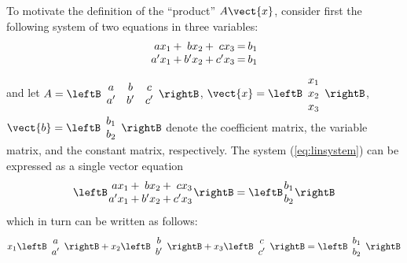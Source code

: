 To motivate the definition of the ``product'' $A\vect{x}$, consider first the following system of two equations in three variables:
\begin{equation}\label{eq:linsystem}
\arraycolsep=1pt
\begin{array}{rrrrrrr}
ax_{1} & + & bx_{2} & + & cx_{3} & = & b_{1} \\
a^{\prime}x_{1} & + & b^{\prime}x_{2} & + & c^{\prime}x_{3} & = & b_{1}
\end{array}
\end{equation}
and let $A = \leftB \begin{array}{ccc}
a & b & c \\
a^\prime & b^\prime & c^\prime
\end{array} \rightB$, 
$\vect{x} = \leftB \begin{array}{c}
x_{1} \\
x_{2} \\
x_{3}
\end{array} \rightB$, 
$\vect{b} = \leftB \begin{array}{c}
b_{1} \\
b_{2}
\end{array} \rightB$ denote the coefficient matrix, the variable matrix, and the constant matrix, respectively. The system (\ref{eq:linsystem}) can be expressed as a single vector equation 
\begin{equation*}
\leftB \arraycolsep=1pt \begin{array}{rrrrr}
ax_{1} & + & bx_{2} & + & cx_{3} \\
a^\prime x_{1} & + & b^\prime x_{2} & + & c^\prime x_{3}
\end{array} \rightB = \leftB \begin{array}{c}
b_{1} \\
b_{2}
\end{array} \rightB
\end{equation*}
which in turn can be written as follows:
\begin{equation*}
x_{1} \leftB \begin{array}{c}
a \\
a^\prime
\end{array} \rightB + 
x_{2} \leftB \begin{array}{c}
b \\
b^\prime
\end{array} \rightB + 
x_{3} \leftB \begin{array}{c}
c \\
c^\prime
\end{array} \rightB = \leftB \begin{array}{c}
b_{1} \\
b_{2}
\end{array} \rightB
\end{equation*}
